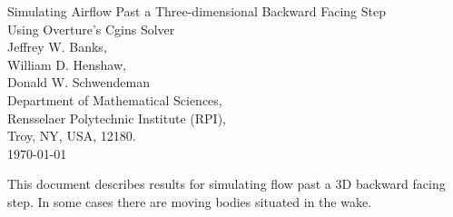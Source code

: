 \documentclass[11pt]{article}
\begin{document}


\def\comma  {~~~,~~}
\newcommand{\uvd}{\mathbf{U}}
\def\ud     {{    U}}
\def\pd     {{    P}}
\def\calo{{\cal O}}

\newcommand{\mbar}{\bar{m}}
\newcommand{\Rbar}{\bar{R}}
\newcommand{\Ru}{R_u}         %
\newcommand{\Div}{\grad\cdot}
\newcommand{\tauv}{\boldsymbol{\tau}}
\newcommand{\thetav}{\boldsymbol{\theta}}

\newcommand{\Omegav}{\boldsymbol{\Omega}}
\newcommand{\omegav}{\boldsymbol{\omega}}
\newcommand{\sigmav}{\boldsymbol{\sigma}}
\newcommand{\cm}{{\rm cm}}

\newcommand{\ds}{\Delta s}
\newcommand{\dsbl}{\ds_{\rm bl}}


\newcommand{\sumi}{\sum_{i=1}^n}
\newcommand{\dt}{{\Delta t}}

\def\ff {\tt} %


\newcommand{\Bc}{{\mathcal B}}
\newcommand{\Dc}{{\mathcal D}}
\newcommand{\Ec}{{\mathcal E}}
\newcommand{\Fc}{{\mathcal F}}
\newcommand{\Gc}{{\mathcal G}}
\newcommand{\Hc}{{\mathcal H}}
\newcommand{\Ic}{{\mathcal I}}
\newcommand{\Jc}{{\mathcal J}}
\newcommand{\Lc}{{\mathcal L}}
\newcommand{\Nc}{{\mathcal N}}
\newcommand{\Pc}{{\mathcal P}}
\newcommand{\Rc}{{\mathcal R}}
\newcommand{\Sc}{{\mathcal S}}

\newcommand{\bogus}[1]{}  %

\vspace{5\baselineskip}
\begin{flushleft}
{\LARGE
Simulating Airflow Past a Three-dimensional Backward Facing Step \\
Using Overture's Cgins Solver\\
}
\vspace{2\baselineskip}
Jeffrey W. Banks,  \\
William D. Henshaw, \\
Donald W. Schwendeman \\
% 
\vspace{2\baselineskip}
% 
Department of Mathematical Sciences, \\
Rensselaer Polytechnic Institute (RPI), \\
Troy, NY, USA, 12180. \\
\vspace{\baselineskip}
\today\\

\vspace{4\baselineskip}


This document describes results for simulating flow past a 3D backward facing step.
In some cases there are moving bodies situated in the wake.

\end{flushleft}
\end{document}
